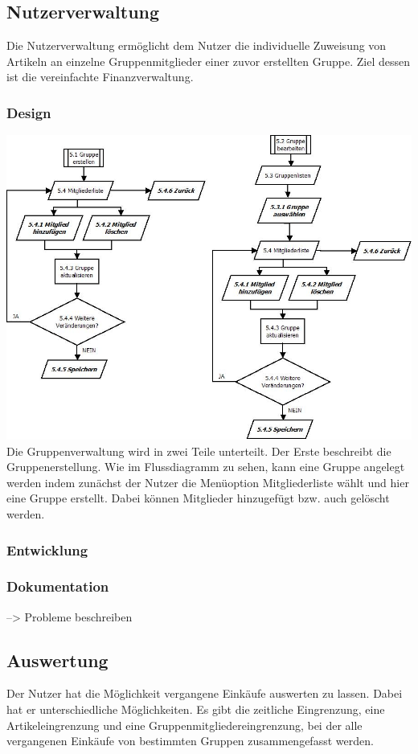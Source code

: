 \documentclass[12pt,a4paper]{article}
\begin{document}
\subsection{Nutzerverwaltung}
Die Nutzerverwaltung ermöglicht dem Nutzer die individuelle Zuweisung von Artikeln an einzelne Gruppenmitglieder einer zuvor erstellten Gruppe. Ziel dessen ist die vereinfachte Finanzverwaltung.

\subsubsection*{Design}
\includegraphics[scale=0.6, origin=l]{Gruppenverwaltung.jpeg}
\newline
\newline
Die Gruppenverwaltung wird in zwei Teile unterteilt. Der Erste beschreibt die Gruppenerstellung. Wie im Flussdiagramm zu sehen, kann eine Gruppe angelegt werden indem zunächst der Nutzer die Menüoption Mitgliederliste wählt und hier eine Gruppe erstellt. Dabei können Mitglieder hinzugefügt bzw. auch gelöscht werden.
\subsubsection*{Entwicklung}

\subsubsection*{Dokumentation} --> Probleme beschreiben
\newpage

\subsection{Auswertung}
Der Nutzer hat die Möglichkeit vergangene Einkäufe auswerten zu lassen. Dabei hat er unterschiedliche Möglichkeiten.  Es gibt die zeitliche Eingrenzung, eine Artikeleingrenzung und eine Gruppenmitgliedereingrenzung, bei der alle vergangenen Einkäufe von bestimmten Gruppen zusammengefasst werden.
\end{document}
